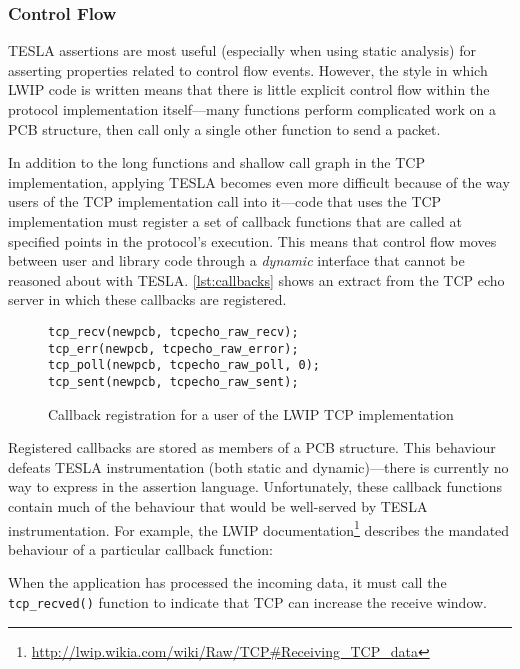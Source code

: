 \subsubsection{Control Flow}

TESLA assertions are most useful (especially when using static analysis)
for asserting properties related to control flow events. However, the
style in which LWIP code is written means that there is little explicit
control flow within the protocol implementation itself---many functions
perform complicated work on a PCB structure, then call only a single
other function to send a packet.

In addition to the long functions and shallow call graph in the TCP
implementation, applying TESLA becomes even more difficult because of the way
users of the TCP implementation call into it---code that uses the TCP
implementation must register a set of callback functions that are called at
specified points in the protocol's execution. This means that control flow moves
between user and library code through a \emph{dynamic} interface that cannot be
reasoned about with TESLA. \autoref{lst:callbacks} shows an extract from the TCP
echo server in which these callbacks are registered.

\begin{figure}
  \begin{verbatim}
tcp_recv(newpcb, tcpecho_raw_recv);
tcp_err(newpcb, tcpecho_raw_error);
tcp_poll(newpcb, tcpecho_raw_poll, 0);
tcp_sent(newpcb, tcpecho_raw_sent);
  \end{verbatim}
  \caption{Callback registration for a user of the LWIP TCP implementation}
  \label{lst:callbacks}
\end{figure}

Registered callbacks are stored as members of a PCB structure. This
behaviour defeats TESLA instrumentation (both static and
dynamic)---there is currently no way to express  in the assertion language.
Unfortunately, these callback functions contain much of the behaviour
that would be well-served by TESLA instrumentation. For example, the
LWIP
documentation\footnote{\url{http://lwip.wikia.com/wiki/Raw/TCP\#Receiving_TCP_data}}
describes the mandated behaviour of a particular callback function:

\begin{displayquote}
When the application has processed the incoming data, it must call the
\texttt{tcp_recved()} function to indicate that TCP can increase
the receive window.
\end{displayquote}


